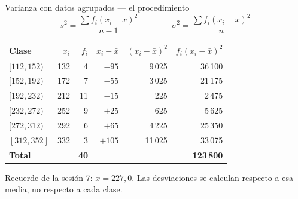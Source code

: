 \documentclass[aspectratio=169,10pt]{beamer}
\begin{document}
\begin{frame}{Varianza con datos agrupados — el procedimiento}
  \scriptsize
  \[ s^2 = \frac{\sum f_i (x_i-\bar{x})^2}{n-1} \qquad\qquad
     \sigma^2 = \frac{\sum f_i (x_i-\bar{x})^2}{n} \]

  \vspace{0.1cm}
  \begin{center}
  \begin{tabular}{@{}lrrrrr@{}}
    \toprule
    \textbf{Clase} & \textbf{$x_i$} & \textbf{$f_i$} &
    \textbf{$x_i-\bar{x}$} & \textbf{$(x_i-\bar{x})^2$} &
    \textbf{$f_i(x_i-\bar{x})^2$} \\
    \midrule
    $[112,152)$ & 132 &  4 & $-95$ &  9\,025 &  36\,100 \\
    $[152,192)$ & 172 &  7 & $-55$ &  3\,025 &  21\,175 \\
    $[192,232)$ & 212 & 11 & $-15$ &     225 &   2\,475 \\
    $[232,272)$ & 252 &  9 & $+25$ &     625 &   5\,625 \\
    $[272,312)$ & 292 &  6 & $+65$ &  4\,225 &  25\,350 \\
    $[312,352]$ & 332 &  3 & $+105$ & 11\,025 & 33\,075 \\
    \midrule
    \textbf{Total} & & \textbf{40} & & & \textbf{123\,800} \\
    \bottomrule
  \end{tabular}
  \end{center}

  \vspace{0.05cm}
  {\tiny\color{uniGris} Recuerde de la sesión 7: $\bar{x} = 227{,}0$. Las
  desviaciones se calculan respecto a esa media, no respecto a cada clase.}
\end{frame}
\end{document}
